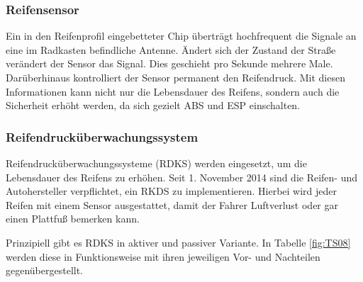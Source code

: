 \begin{flushleft}
	                \subsubsection{Reifensensor}
	
	                Ein in den Reifenprofil eingebetteter Chip überträgt hochfrequent die Signale an eine im Radkasten befindliche Antenne. 
	                Ändert sich der Zustand der Straße verändert der Sensor das Signal. Dies geschieht pro Sekunde mehrere Male. 
	                Darüberhinaus kontrolliert der Sensor permanent den Reifendruck. Mit diesen Informationen kann nicht nur die Lebensdauer des Reifens, sondern auch die Sicherheit erhöht werden, 
	                da sich gezielt ABS und ESP einschalten.\\ 
				
	                \subsubsection{Reifendrucküberwachungssystem}
	                Reifendrucküberwachungssysteme (RDKS) werden eingesetzt, um die Lebensdauer des Reifens zu erhöhen. Seit 1. November 2014 sind die Reifen- und Autohersteller verpflichtet, ein RKDS zu implementieren.
	                Hierbei wird jeder Reifen mit einem Sensor ausgestattet, damit der Fahrer Luftverlust oder gar einen Plattfuß bemerken kann.
	                
	                Prinzipiell gibt es RDKS in aktiver und passiver Variante. In Tabelle \ref{fig:TS08} werden diese in Funktionsweise mit ihren jeweiligen
	                Vor- und Nachteilen gegenübergestellt.
	
	                \begin{table}
	                    \begin{tabularx}{\textwidth} {l|l}
	                        

\end{tabularx}
\end{table}
\end{flushleft}
